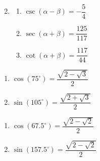 \begin{enumerate}
\begin{multicols}{3}
\begin{enumerate}
\end{enumerate}

\end{multicols}

\pagebreak 

\item \begin{multicols}{3}

\begin{enumerate}

\item $\csc(\alpha - \beta) = -\dfrac{5}{4}$
\item $\sec(\alpha + \beta) = \dfrac{125}{117}$
\item $\cot(\alpha + \beta) = \dfrac{117}{44}$

\end{enumerate}

\end{multicols}

\setcounter{HW}{\value{enumi}}

\end{enumerate}

\begin{multicols}{2}

\begin{enumerate}

\setcounter{enumi}{\value{HW}}

\addtocounter{enumi}{13}

\item $\cos(75^{\circ}) = \dfrac{\sqrt{2-\sqrt{3}}}{2}$ 
\item $\sin(105^{\circ}) = \dfrac{\sqrt{2+\sqrt{3}}}{2}$ 

\setcounter{HW}{\value{enumi}}

\end{enumerate}

\end{multicols}

\begin{multicols}{2}

\begin{enumerate}

\setcounter{enumi}{\value{HW}}

\item $\cos(67.5^{\circ})  = \dfrac{\sqrt{2-\sqrt{2}}}{2}$ 
\item $\sin(157.5^{\circ}) = \dfrac{\sqrt{2-\sqrt{2}}}{2}$ 

\setcounter{HW}{\value{enumi}}

\end{enumerate}

\end{multicols}

